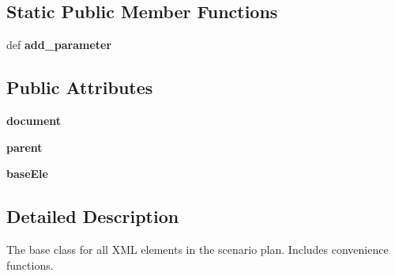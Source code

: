 \subsection*{Static Public Member Functions}
\begin{DoxyCompactItemize}
\item 
\hypertarget{classcore_1_1misc_1_1xmlwriter1_1_1_xml_element_aa98e9965c8e86a516e1d5fb0bcfff626}{def {\bfseries add\+\_\+parameter}}\label{classcore_1_1misc_1_1xmlwriter1_1_1_xml_element_aa98e9965c8e86a516e1d5fb0bcfff626}

\end{DoxyCompactItemize}
\subsection*{Public Attributes}
\begin{DoxyCompactItemize}
\item 
\hypertarget{classcore_1_1misc_1_1xmlwriter1_1_1_xml_element_a67cd6e5a2ca81de3c16b69e71d6088b5}{{\bfseries document}}\label{classcore_1_1misc_1_1xmlwriter1_1_1_xml_element_a67cd6e5a2ca81de3c16b69e71d6088b5}

\item 
\hypertarget{classcore_1_1misc_1_1xmlwriter1_1_1_xml_element_aa0efbce8bd80e85a2b314ff5278981d2}{{\bfseries parent}}\label{classcore_1_1misc_1_1xmlwriter1_1_1_xml_element_aa0efbce8bd80e85a2b314ff5278981d2}

\item 
\hypertarget{classcore_1_1misc_1_1xmlwriter1_1_1_xml_element_a663a585d498c1c54fb5bafe11c079b61}{{\bfseries base\+Ele}}\label{classcore_1_1misc_1_1xmlwriter1_1_1_xml_element_a663a585d498c1c54fb5bafe11c079b61}

\end{DoxyCompactItemize}


\subsection{Detailed Description}
\begin{DoxyVerb}The base class for all XML elements in the scenario plan. Includes
convenience functions.
\end{DoxyVerb}
 

